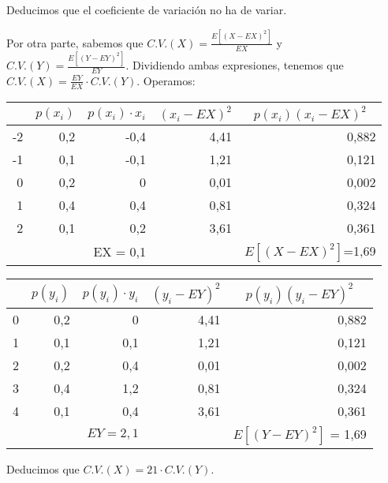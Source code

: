 Deducimos que el coeficiente de variación no ha de variar. 

Por otra parte, sabemos que $C.V.(X) = \frac{E[(X-EX)^2]}{EX}$ y $C.V.(Y) = \frac{E[(Y-EY)^2]}{EY}$. Dividiendo ambas expresiones, tenemos que $C.V.(X) = \frac{EY}{EX}·C.V.(Y)$. Operamos:

\begin{center}
	\begin{tabular}{|r|r|r|r|r|}
		\hline
		\multicolumn{1}{|c|}{} & \multicolumn{1}{c|}{$p(x_i)$} & \multicolumn{1}{c|}{$p(x_i)·x_i$} & \multicolumn{1}{c|}{$(x_i-EX)^2$} & \multicolumn{1}{c|}{$p(x_i)(x_i-EX)^2$} \\ \hline
		-2 & 0,2 & -0,4 & 4,41 & 0,882 \\ \hline
		-1 & 0,1 & -0,1 & 1,21 & 0,121 \\ \hline
		0 & 0,2 & 0 & 0,01 & 0,002 \\ \hline
		1 & 0,4 & 0,4 & 0,81 & 0,324 \\ \hline
		2 & 0,1 & 0,2 & 3,61 & 0,361 \\ \hline
		\multicolumn{1}{|l|}{} & \multicolumn{1}{l|}{} & EX = 0,1 & \multicolumn{1}{l|}{} & $E[(X-EX)^2]$=1,69 \\ \hline
	\end{tabular}
\end{center}

\begin{center}
	\begin{tabular}{|r|r|r|r|r|}
		\hline
		\multicolumn{1}{|c|}{} & \multicolumn{1}{c|}{$p(y_i)$} & \multicolumn{1}{c|}{$p(y_i)·y_i$} & \multicolumn{1}{c|}{$(y_i-EY)^2$} & \multicolumn{1}{c|}{$p(y_i)(y_i-EY)^2$} \\ \hline
		0 & 0,2 & 0 & 4,41 & 0,882 \\ \hline
		1 & 0,1 & 0,1 & 1,21 & 0,121 \\ \hline
		2 & 0,2 & 0,4 & 0,01 & 0,002 \\ \hline
		3 & 0,4 & 1,2 & 0,81 & 0,324 \\ \hline
		4 & 0,1 & 0,4 & 3,61 & 0,361 \\ \hline
		\multicolumn{1}{|l|}{} & \multicolumn{1}{l|}{} & $EY = 2,1$ & \multicolumn{1}{l|}{} & $E[(Y-EY)^2]$ = 1,69 \\ \hline
	\end{tabular}
\end{center}

Deducimos que $C.V.(X) = 21·C.V.(Y)$. 

